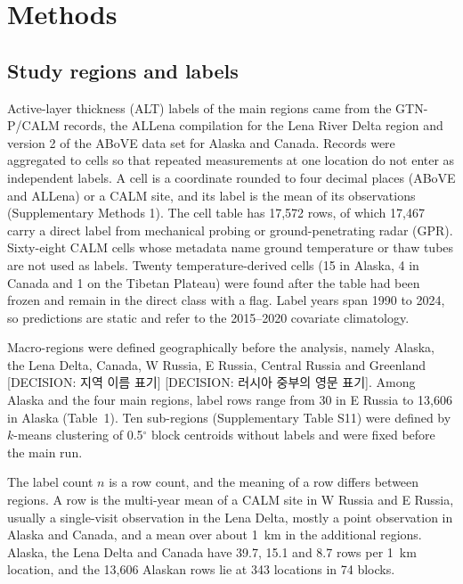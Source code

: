 \section{Methods}\label{sec:methods}

\subsection{Study regions and labels}\label{sec:m-labels}

Active-layer thickness (ALT) labels of the main regions came from the GTN-P/CALM records\cite{Streletskiy2025}, the ALLena compilation for the Lena River Delta region\cite{Veremeeva2025} and version 2 of the ABoVE data set for Alaska and Canada\cite{Moore2025}. Records were aggregated to cells so that repeated measurements at one location do not enter as independent labels. A cell is a coordinate rounded to four decimal places (ABoVE and ALLena) or a CALM site, and its label is the mean of its observations (Supplementary Methods 1). The cell table has 17,572 rows, of which 17,467 carry a direct label from mechanical probing or ground-penetrating radar (GPR). Sixty-eight CALM cells whose metadata name ground temperature or thaw tubes are not used as labels. Twenty temperature-derived cells (15 in Alaska, 4 in Canada and 1 on the Tibetan Plateau) were found after the table had been frozen and remain in the direct class with a flag. Label years span 1990 to 2024, so predictions are static and refer to the 2015--2020 covariate climatology.

Macro-regions were defined geographically before the analysis, namely Alaska, the Lena Delta, Canada, W Russia, E Russia, Central Russia and Greenland [DECISION: 지역 이름 표기] [DECISION: 러시아 중부의 영문 표기]. Among Alaska and the four main regions, label rows range from 30 in E Russia to 13,606 in Alaska (Table~1). Ten sub-regions (Supplementary Table S11) were defined by $k$-means clustering of 0.5$^{\circ}$ block centroids without labels and were fixed before the main run.

The label count $n$ is a row count, and the meaning of a row differs between regions. A row is the multi-year mean of a CALM site in W Russia and E Russia, usually a single-visit observation in the Lena Delta, mostly a point observation in Alaska and Canada, and a mean over about 1~km in the additional regions. Alaska, the Lena Delta and Canada have 39.7, 15.1 and 8.7 rows per 1~km location, and the 13,606 Alaskan rows lie at 343 locations in 74 blocks.

